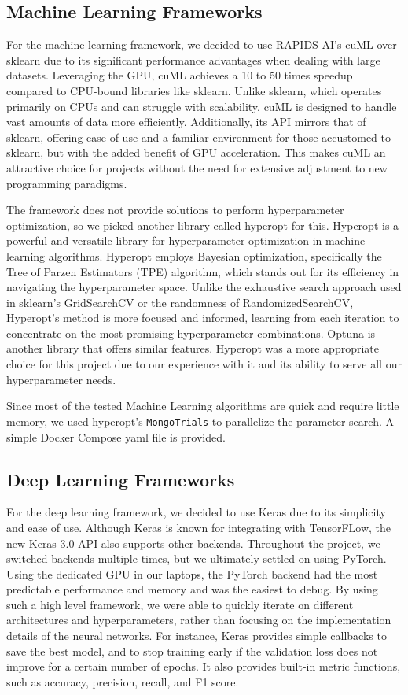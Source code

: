 \documentclass{article}
\begin{document}
    \subsection{Machine Learning Frameworks}
    For the machine learning framework, we decided to use RAPIDS AI’s cuML over sklearn due to its significant performance advantages when dealing with large datasets.
    Leveraging the GPU, cuML achieves a 10 to 50 times speedup compared to CPU-bound libraries like sklearn.
    Unlike sklearn, which operates primarily on CPUs and can struggle with scalability, cuML is designed to handle vast amounts of data more efficiently.
    Additionally, its API mirrors that of sklearn, offering ease of use and a familiar environment for those accustomed to sklearn, but with the added benefit of GPU acceleration.
    This makes cuML an attractive choice for projects without the need for extensive adjustment to new programming paradigms.

    The framework does not provide solutions to perform hyperparameter optimization, so we picked another library called hyperopt for this.
    Hyperopt is a powerful and versatile library for hyperparameter optimization in machine learning algorithms.
    Hyperopt employs Bayesian optimization, specifically the Tree of Parzen Estimators (TPE) algorithm, which stands out for its efficiency in navigating the hyperparameter space.
    Unlike the exhaustive search approach used in sklearn's GridSearchCV or the randomness of RandomizedSearchCV, Hyperopt's method is more focused and informed, learning from each iteration to concentrate on the most promising hyperparameter combinations.
    Optuna is another library that offers similar features.
    Hyperopt was a more appropriate choice for this project due to our experience with it and its ability to serve all our hyperparameter needs.

    Since most of the tested Machine Learning algorithms are quick and require little memory, we used hyperopt's \texttt{MongoTrials} to parallelize the parameter search.
    A simple Docker Compose yaml file is provided.

    \subsection{Deep Learning Frameworks}
    For the deep learning framework, we decided to use Keras due to its simplicity and ease of use.
    Although Keras is known for integrating with TensorFLow, the new Keras 3.0 API also supports other backends.
    Throughout the project, we switched backends multiple times, but we ultimately settled on using PyTorch.
    Using the dedicated GPU in our laptops, the PyTorch backend had the most predictable performance and memory and was the easiest to debug.
    By using such a high level framework, we were able to quickly iterate on different architectures and hyperparameters, rather than focusing on the implementation details of the neural networks.
    For instance, Keras provides simple callbacks to save the best model, and to stop training early if the validation loss does not improve for a certain number of epochs.
    It also provides built-in metric functions, such as accuracy, precision, recall, and F1 score.
\end{document}
